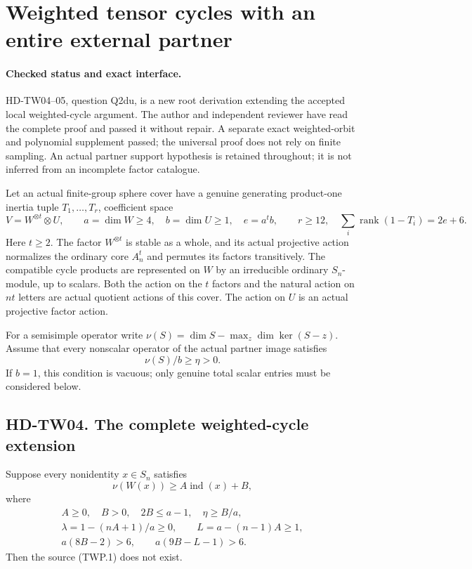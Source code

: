 \section{Weighted tensor cycles with an entire external partner}
\label{sec:tensor-weighted-partner-extension}

\paragraph{Checked status and exact interface.}
HD-TW04--05, question Q2du, is a new root derivation extending the accepted local weighted-cycle argument. The author and independent reviewer have read the complete proof and passed it without repair. A separate exact weighted-orbit and polynomial supplement passed; the universal proof does not rely on finite sampling. An actual partner support
hypothesis is retained throughout; it is not inferred from an incomplete
factor catalogue.

Let an actual finite-group sphere cover have a genuine generating
product-one inertia tuple \(T_1,\ldots,T_r\), coefficient space
\[
 V=W^{\otimes t}\otimes U,\qquad
 a=\dim W\ge4,\quad b=\dim U\ge1,\quad e=a^t b,
 \qquad r\ge12,\quad \sum_i\operatorname{rank}(1-T_i)=2e+6.
 \tag{TWP.1}
\]
Here \(t\ge2\). The factor \(W^{\otimes t}\) is stable as a whole,
and its actual projective action normalizes the ordinary core \(A_n^t\)
and permutes its factors transitively. The compatible cycle products
are represented on \(W\) by an irreducible ordinary \(S_n\)-module,
up to scalars. Both the action on the \(t\) factors and the natural
action on \(nt\) letters are actual quotient actions of this cover.
The action on \(U\) is an actual projective factor action.

For a semisimple operator write \(\nu(S)=\dim S-\max_z\dim\ker(S-z)\).
Assume that every nonscalar operator of the actual partner image satisfies
\[
                         \nu(S)/b\ge\eta>0.
                         \tag{TWP.2}
\]
If \(b=1\), this condition is vacuous; only genuine total scalar
entries must be considered below.

\subsection*{HD-TW04. The complete weighted-cycle extension}

Suppose every nonidentity \(x\in S_n\) satisfies
\[
                    \nu(W(x))\ge A\operatorname{ind}(x)+B,
                    \tag{TWP.3}
\]
where
\[
 \begin{gathered}
 A\ge0,\quad B>0,\quad 2B\le a-1,\quad
 \eta\ge B/a,\\
 \lambda=1-(nA+1)/a\ge0,\qquad L=a-(n-1)A\ge1,\\
                 a(8B-2)>6,\qquad a(9B-L-1)>6.
 \end{gathered}\tag{TWP.4}
\]
Then the source (TWP.1) does not exist.

